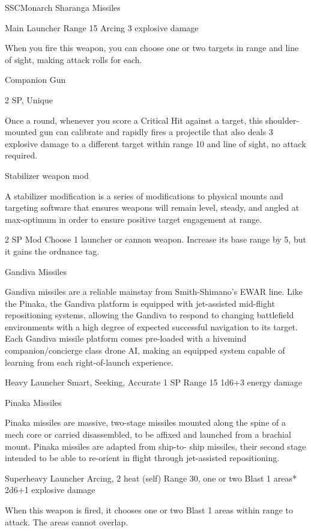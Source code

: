 \begin{mech}{SSC}{Monarch}
Sharanga Missiles
  
Main Launcher
Range 15
Arcing
3 explosive damage

When you fire this weapon, you can choose one or two targets in range and line of sight, making attack rolls for each.


Companion Gun

2 SP, Unique

Once a round, whenever you score a Critical Hit against a target, this shoulder-mounted gun can calibrate and rapidly fires a projectile that also deals 3 explosive damage to a different target within range 10 and line of sight, no attack required.


Stabilizer weapon mod

A stabilizer modification is a series of modifications to physical mounts and targeting software that ensures weapons will remain level, steady, and angled at max-optimum in order to ensure positive target engagement at range.

2 SP
Mod
Choose 1 launcher or cannon weapon. Increase its base range by 5, but it gains the ordnance tag.


Gandiva Missiles

Gandiva missiles are a reliable mainstay from Smith-Shimano’s EWAR line. Like the Pinaka, the Gandiva platform is equipped with jet-assisted mid-flight repositioning systems, allowing the Gandiva to respond to changing battlefield environments with a high degree of expected successful navigation to its target. Each Gandiva missile platform comes pre-loaded with a hivemind companion/concierge class drone AI, making an equipped system capable of learning from each right-of-launch experience.

Heavy Launcher
Smart, Seeking, Accurate
1 SP
Range 15
1d6+3 energy damage


Pinaka Missiles

Pinaka missiles are massive, two-stage missiles mounted along the spine of a mech core or carried disassembled, to be affixed and launched from a brachial mount.  Pinaka missiles are adapted from ship-to- ship missiles, their second stage intended to be able to re-orient in flight through jet-assisted repositioning.

Superheavy Launcher
Arcing, 2 heat (self)
Range 30, one or two Blast 1 areas*
2d6+1 explosive damage

When this weapon is fired, it chooses one or two Blast 1 areas within range to attack. The areas cannot overlap.



\end{mech}
